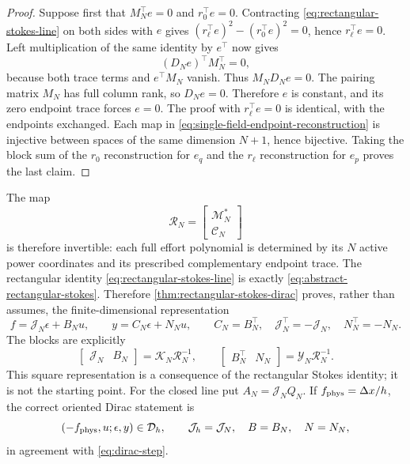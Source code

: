 \documentclass[11pt,a4paper]{article}
\begin{document}
\begin{proof}
Suppose first that \(M_N^\top e=0\) and \(r_0^\top e=0\).  Contracting
\cref{eq:rectangular-stokes-line} on both sides with \(e\) gives
\((r_\ell^\top e)^2-(r_0^\top e)^2=0\), hence
\(r_\ell^\top e=0\).  Left multiplication of the same identity by
\(e^\top\) now gives
\[
 (D_Ne)^\top M_N^\top=0,
 \]
because both trace terms and \(e^\top M_N\) vanish.  Thus
\(M_ND_Ne=0\).  The pairing matrix \(M_N\) has full column rank, so
\(D_Ne=0\).  Therefore \(e\) is constant, and its zero endpoint trace
forces \(e=0\).  The proof with \(r_\ell^\top e=0\) is identical, with
the endpoints exchanged.  Each map in
\cref{eq:single-field-endpoint-reconstruction} is injective between
spaces of the same dimension \(N+1\), hence bijective.  Taking the block
sum of the \(r_0\) reconstruction for \(e_q\) and the \(r_\ell\)
reconstruction for \(e_p\) proves the last claim.
\end{proof}

The map
\begin{equation}\label{eq:line-effort-input-reconstruction}
 \mathcal R_N=
 \begin{bmatrix}\mathcal M_N^*\\\mathcal C_N\end{bmatrix}
\end{equation}
is therefore invertible: each full effort polynomial is determined by
its \(N\) active power coordinates and its prescribed complementary
endpoint trace.  The rectangular identity \cref{eq:rectangular-stokes-line} is
exactly \cref{eq:abstract-rectangular-stokes}.  Therefore
\cref{thm:rectangular-stokes-dirac} proves, rather than assumes, the
finite-dimensional representation
\begin{equation}\label{eq:reduced-open-line}
 f=\mathcal J_N\epsilon+B_Nu,
 \qquad
 y=C_N\epsilon+N_Nu,
 \qquad
 C_N=B_N^\top,\quad
 \mathcal J_N^\top=-\mathcal J_N,\quad N_N^\top=-N_N.
\end{equation}
The blocks are explicitly
\begin{equation}\label{eq:line-square-block-recovery}
 \begin{bmatrix}\mathcal J_N&B_N\end{bmatrix}
 =\mathcal K_N\mathcal R_N^{-1},\qquad
 \begin{bmatrix}B_N^\top&N_N\end{bmatrix}
 =\mathcal Y_N\mathcal R_N^{-1}.
\end{equation}
This square representation is a consequence of the rectangular Stokes
identity; it is not the starting point.  For the closed line put
\(A_N=\mathcal J_NQ_N\).  If \(f_{\rm phys}=\Delta x/h\), the correct
oriented Dirac statement is
\begin{equation}\label{eq:line-oriented-dirac-identification}
 (-f_{\rm phys},u;\epsilon,y)\in\mathcal D_h,
 \qquad \mathcal J_h=\mathcal J_N,\quad B=B_N,\quad N=N_N,
\end{equation}
in agreement with \cref{eq:dirac-step}.
\end{document}
